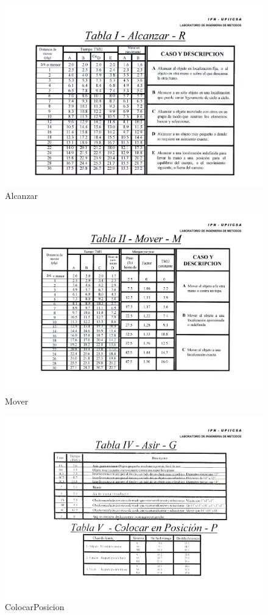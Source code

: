 \begin{figure}[H]
    \centering
    \includegraphics[scale=0.3]{13/img/tablaAlcanzar.pdf}
    \caption{Alcanzar}
    \label{fig:Alcanzar}
\end{figure}
\begin{figure}[H]
    \centering
    \includegraphics[scale=0.3]{13/img/tablaMover.pdf}
    \caption{Mover}
    \label{fig:Mover}
\end{figure}
\begin{figure}[H]
    \centering
    \includegraphics[scale=0.5]{13/img/tablaColocarPosicion.pdf}
    \caption{ColocarPosicion}
    \label{fig:ColocarPosicion}
\end{figure}
